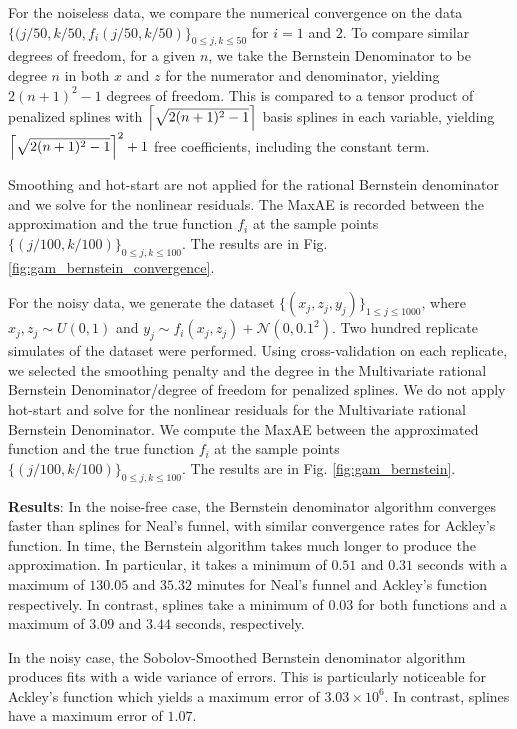 \documentclass{article}
\begin{document}
For the noiseless data, we compare the numerical convergence on the data \\
$\{(j/50, k/50, f_i(j/50, k/50)\}_{0\leq j, k\leq 50}$ for $i=1$ and $2$. To compare similar degrees of freedom, for a given $n$, we take the Bernstein Denominator to be degree $n$ in both $x$ and $z$ for the numerator and denominator, yielding $2(n + 1)^2 - 1$ degrees of freedom. This is compared to a tensor product of penalized splines with $\Big{\lceil}\sqrt{2(n + 1)^2 - 1}\Big{\rceil}$ basis splines in each variable, yielding $\Big{\lceil}\sqrt{2(n + 1)^2 - 1}\Big{\rceil}^2 + 1$ free coefficients, including the constant term. 

Smoothing and hot-start are not applied for the rational Bernstein denominator and we solve for the nonlinear residuals.
The MaxAE is recorded between the approximation and the true function $f_i$ at the sample points $\{(j/100, k/100)\}_{0\leq j, k\leq 100}$. The results are in Fig. \ref{fig:gam_bernstein_convergence}.

For the noisy data, we generate the dataset $\{(x_j, z_j, y_j)\}_{1\leq j\leq 1000}$, where $x_j, z_j \sim U(0, 1)$ and $y_j \sim f_i(x_j, z_j) + \mathcal{N}(0, 0.1^2)$. Two hundred replicate simulates of the dataset were performed. Using cross-validation on each replicate, we selected the smoothing penalty and the degree in the Multivariate rational Bernstein Denominator/degree of freedom for penalized splines. We do not apply hot-start and solve for the nonlinear residuals for the Multivariate rational Bernstein Denominator. We compute the MaxAE between the approximated function and the true function $f_i$ at the sample points $\{(j/100, k/100)\}_{0\leq j, k\leq 100}$. The results are in Fig. \ref{fig:gam_bernstein}.

{\textbf{Results}: In the noise-free case, the Bernstein denominator algorithm converges faster than splines for Neal's funnel, with similar convergence rates for Ackley's function. In time, the Bernstein algorithm takes much longer to produce the approximation. In particular, it takes a minimum of $0.51$ and $0.31$ seconds with a maximum of $130.05$ and $35.32$ minutes for Neal's funnel and Ackley's function respectively. In contrast, splines take a minimum of $0.03$ for both functions and a maximum of $3.09$ and $3.44$ seconds, respectively.}

{In the noisy case, the Sobolov-Smoothed Bernstein denominator algorithm produces fits with a wide variance of errors. This is particularly noticeable for Ackley's function which yields a maximum error of $3.03\times10^{6}$. In contrast, splines have a maximum error of $1.07$. }
\end{document}
